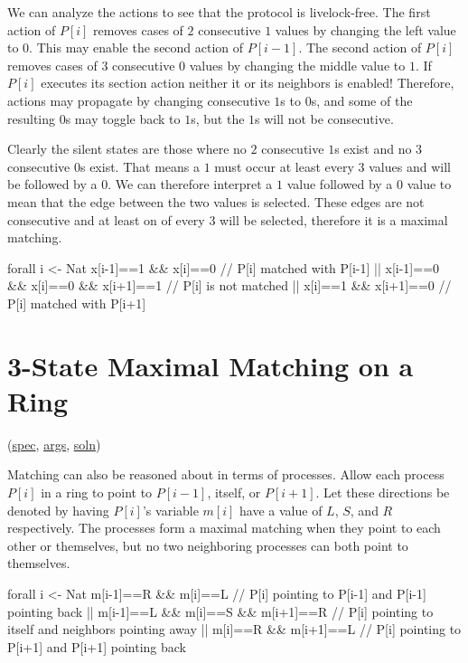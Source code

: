 We can analyze the actions to see that the protocol is livelock-free.
The first action of $P[i]$ removes cases of $2$ consecutive $1$ values by changing the left value to $0$.
This may enable the second action of $P[i-1]$.
The second action of $P[i]$ removes cases of $3$ consecutive $0$ values by changing the middle value to $1$.
If $P[i]$ executes its section action neither it or its neighbors is enabled!
Therefore, actions may propagate by changing consecutive $1$s to $0$s, and some of the resulting $0$s may toggle back to $1$s, but the $1$s will not be consecutive.

Clearly the silent states are those where no $2$ consecutive $1$s exist and no $3$ consecutive $0$s exist.
That means a $1$ must occur at least every $3$ values and will be followed by a $0$.
We can therefore interpret a $1$ value followed by a $0$ value to mean that the edge between the two values is selected.
These edges are not consecutive and at least on of every $3$ will be selected, therefore it is a maximal matching.
\begin{code}
forall i <- Nat %
   x[i-1]==1 && x[i]==0               // P[i] matched with P[i-1]
|| x[i-1]==0 && x[i]==0 && x[i+1]==1  // P[i] is not matched
||              x[i]==1 && x[i+1]==0  // P[i] matched with P[i+1]
\end{code}

\section{3-State Maximal Matching on a Ring}
\label{sec:MatchRingThreeState}

(\href{\examplespec/MatchRingThreeState.prot}{spec},
\href{\examplesett/MatchRingThreeState.args}{args},
\href{\examplesoln/MatchRingThreeState.prot}{soln})

Matching can also be reasoned about in terms of processes.
Allow each process $P[i]$ in a ring to point to $P[i-1]$, itself, or $P[i+1]$.
Let these directions be denoted by having $P[i]$'s variable $m[i]$ have a value of $L$, $S$, and $R$ respectively.
The processes form a maximal matching when they point to each other or themselves, but no two neighboring processes can both point to themselves.
\begin{code}
forall i <- Nat %
   m[i-1]==R && m[i]==L               // P[i] pointing to P[i-1] and P[i-1] pointing back
|| m[i-1]==L && m[i]==S && m[i+1]==R  // P[i] pointing to itself and neighbors pointing away
||              m[i]==R && m[i+1]==L  // P[i] pointing to P[i+1] and P[i+1] pointing back
\end{code}

